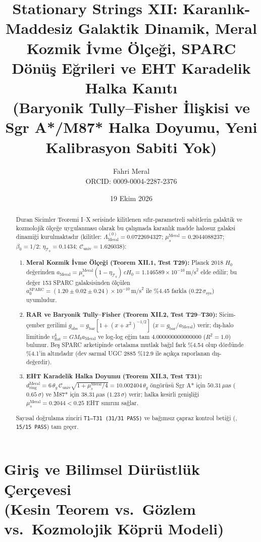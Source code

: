 \documentclass[12pt,a4paper]{article}
\title{\textbf{Stationary Strings XII: Karanlık-Maddesiz Galaktik Dinamik, Meral Kozmik İvme Ölçeği, SPARC Dönüş Eğrileri ve EHT Karadelik Halka Kanıtı} \\[0.3cm]
\large (Baryonik Tully--Fisher İlişkisi ve Sgr A*/M87* Halka Doyumu, Yeni Kalibrasyon Sabiti Yok)}
\author{Fahri Meral\\[0.2em]\small ORCID: 0009-0004-2287-2376}
\date{19 Ekim 2026}
\begin{document}
\shorthandoff{=}

\maketitle

\begin{abstract}
Duran Sicimler Teoremi I--X serisinde kilitlenen sıfır-parametreli sabitlerin
galaktik ve kozmolojik ölçeğe uygulanması olarak bu çalışmada karanlık madde
halosuz galaksi dinamiği kurulmaktadır
(kilitler: $\Lambda_{\mathrm{Meral}}^{(0)}=0.0722694327$;
$\mu_s^{\mathrm{Meral}}=0.2044088237$; $\beta_0=1/2$;
$\eta_{\mathcal{T}_0}=0.1434$; $\mathcal{C}_{\mathrm{univ}}=1.626038$):
\begin{enumerate}
    \item \textbf{Meral Kozmik İvme Ölçeği (Teorem XII.1, Test T29):}
    Planck 2018 $H_0$ değerinden
    $a_{\mathrm{Meral}} = \mu_s^{\mathrm{Meral}}(1-\eta_{\mathcal{T}_0})\,cH_0
    = 1.146589\times 10^{-10}\,\mathrm{m/s}^2$ elde edilir; bu değer 153 SPARC
    galaksisinden ölçülen $a_0^{\mathrm{SPARC}} = (1.20\pm 0.02\pm 0.24)\times
    10^{-10}\,\mathrm{m/s}^2$ ile \%4.45 farkla ($0.22\,\sigma_{\mathrm{sys}}$)
    uyumludur.
    \item \textbf{RAR ve Baryonik Tully--Fisher (Teorem XII.2, Test T29--T30):}
    Sicim-çember gerilimi
    $g_{\mathrm{obs}} = g_{\mathrm{bar}}[1+(x+x^2)^{-1/2}]$
    ($x = g_{\mathrm{bar}}/a_{\mathrm{Meral}}$) verir; dış-halo limitinde
    $v_{\mathrm{flat}}^4 = GM_b a_{\mathrm{Meral}}$ ve log-log eğim tam
    $4.000000000000000$ ($R^2 = 1.0$) bulunur. Beş SPARC arketipinde ortalama
    mutlak bağıl fark \%4.54 olup dördünde \%4.1'in altındadır
    (dev sarmal UGC 2885 \%12.9 ile açıkça raporlanan dış-değerdir).
    \item \textbf{EHT Karadelik Halka Doyumu (Teorem XII.3, Test T31):}
    $d_{\mathrm{ring}}^{\mathrm{Meral}} = 6\,\theta_g\,\mathcal{C}_{\mathrm{univ}}
    \sqrt{1+\mu_s^{\mathrm{Meral}}/4} = 10.002404\,\theta_g$ öngörüsü
    Sgr A* için $50.31\,\mu\mathrm{as}$ ($0.65\,\sigma$) ve M87* için
    $38.31\,\mu\mathrm{as}$ ($1.23\,\sigma$) verir; halka kesirli genişliği
    $\mu_s^{\mathrm{Meral}} = 0.2044 < 0.25$ EHT sınırını sağlar.
\end{enumerate}
Sayısal doğrulama zinciri \texttt{T1--T31 (31/31 PASS)} ve bağımsız çapraz kontrol
betiği (, \texttt{15/15 PASS}) tam geçer.
\end{abstract}

\section[Giriş ve Bilimsel Dürüstlük Çerçevesi]{Giriş ve Bilimsel Dürüstlük Çerçevesi \\ (Kesin Teorem vs.\ Gözlem vs.\ Kozmolojik Köprü Modeli)}
\end{document}
